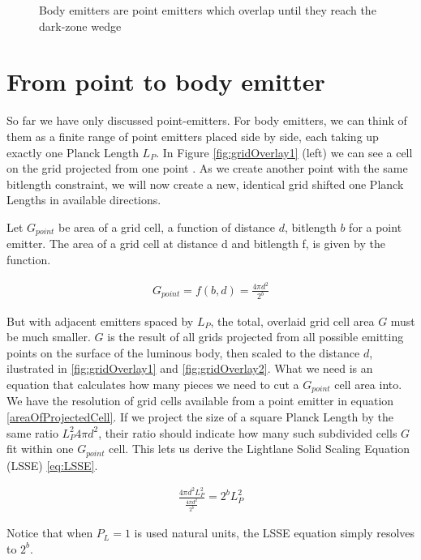 \documentclass[notitlepage]{article}
\begin{document}
\begin{figure}
\caption{Body emitters are point emitters which overlap until they reach the dark-zone wedge}\label{fig:solidDarkZone}

\end{figure}


\section*{From point to body emitter}
So far we have only discussed point-emitters. For body emitters, we can think of them as a finite range of point emitters placed side by side, each taking up exactly one Planck Length  $ L_P $. In Figure \ref{fig:gridOverlay1} (left) we can see a cell on the grid projected from one point . As we create another point with the same bitlength constraint, we will now create a new, identical grid shifted one Planck Lengths in available directions. 

Let $G_{point}$ be area of a grid cell, a function of distance $d$, bitlength $b $ for a point emitter. The area of a grid cell at distance d and bitlength f, is given by the function.

\begin{align}
\label{areaOfProjectedCell}
G_{point}= f(b, d) = \frac{4\pi d^2}{2^b}
\end{align}

But with adjacent emitters spaced by $ L_P $, the total, overlaid grid cell area $ G $ must be much smaller. $G$ is the result of all grids projected from all possible emitting points on the surface of the luminous body, then scaled to the distance $d$, ilustrated in \ref{fig:gridOverlay1} and \ref{fig:gridOverlay2}. What we need is an equation that calculates how many pieces we need to cut a $ G_{point} $ cell area into. We have the resolution of grid cells available from a point emitter in equation \eqref{areaOfProjectedCell}. If we project the size of a square Planck Length by the same ratio $ L_P^2 4 \pi d^2 $, their ratio should indicate how many such subdivided cells $ G $ fit within one $G_{point}$ cell. This lets us derive the Lightlane Solid Scaling Equation (LSSE) \eqref{eq:LSSE}.

\begin{align}
\frac{4 \pi d^2 L_P^2 } {\frac{4 \pi d^2 }{2^b}} = 2^b L_P^2
\label{eq:LSSE}
\end{align}

Notice that when $P_L =1$ is used natural units, the LSSE equation simply resolves to $2^b$. 
\end{document}
